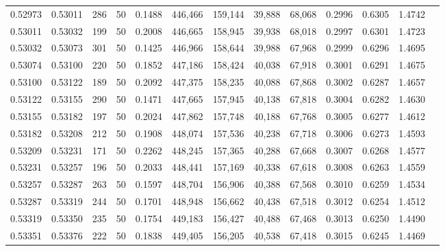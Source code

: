 \begin{tabular}{rrrrrrrrrrrrr}
0.52973 & 0.53011 &   286 &  50 &                                     0.1488 & 446,466 & 159,144 &  39,888 &  68,068 & 0.2996 & 0.6305 & 1.4742 \\
0.53011 & 0.53032 &   199 &  50 &                                     0.2008 & 446,665 & 158,945 &  39,938 &  68,018 & 0.2997 & 0.6301 & 1.4723 \\
0.53032 & 0.53073 &   301 &  50 &                                     0.1425 & 446,966 & 158,644 &  39,988 &  67,968 & 0.2999 & 0.6296 & 1.4695 \\
0.53074 & 0.53100 &   220 &  50 &                                     0.1852 & 447,186 & 158,424 &  40,038 &  67,918 & 0.3001 & 0.6291 & 1.4675 \\
0.53100 & 0.53122 &   189 &  50 &                                     0.2092 & 447,375 & 158,235 &  40,088 &  67,868 & 0.3002 & 0.6287 & 1.4657 \\
0.53122 & 0.53155 &   290 &  50 &                                     0.1471 & 447,665 & 157,945 &  40,138 &  67,818 & 0.3004 & 0.6282 & 1.4630 \\
0.53155 & 0.53182 &   197 &  50 &                                     0.2024 & 447,862 & 157,748 &  40,188 &  67,768 & 0.3005 & 0.6277 & 1.4612 \\
0.53182 & 0.53208 &   212 &  50 &                                     0.1908 & 448,074 & 157,536 &  40,238 &  67,718 & 0.3006 & 0.6273 & 1.4593 \\
0.53209 & 0.53231 &   171 &  50 &                                     0.2262 & 448,245 & 157,365 &  40,288 &  67,668 & 0.3007 & 0.6268 & 1.4577 \\
0.53231 & 0.53257 &   196 &  50 &                                     0.2033 & 448,441 & 157,169 &  40,338 &  67,618 & 0.3008 & 0.6263 & 1.4559 \\
0.53257 & 0.53287 &   263 &  50 &                                     0.1597 & 448,704 & 156,906 &  40,388 &  67,568 & 0.3010 & 0.6259 & 1.4534 \\
0.53287 & 0.53319 &   244 &  50 &                                     0.1701 & 448,948 & 156,662 &  40,438 &  67,518 & 0.3012 & 0.6254 & 1.4512 \\
0.53319 & 0.53350 &   235 &  50 &                                     0.1754 & 449,183 & 156,427 &  40,488 &  67,468 & 0.3013 & 0.6250 & 1.4490 \\
0.53351 & 0.53376 &   222 &  50 &                                     0.1838 & 449,405 & 156,205 &  40,538 &  67,418 & 0.3015 & 0.6245 & 1.4469 \\

\end{tabular}
